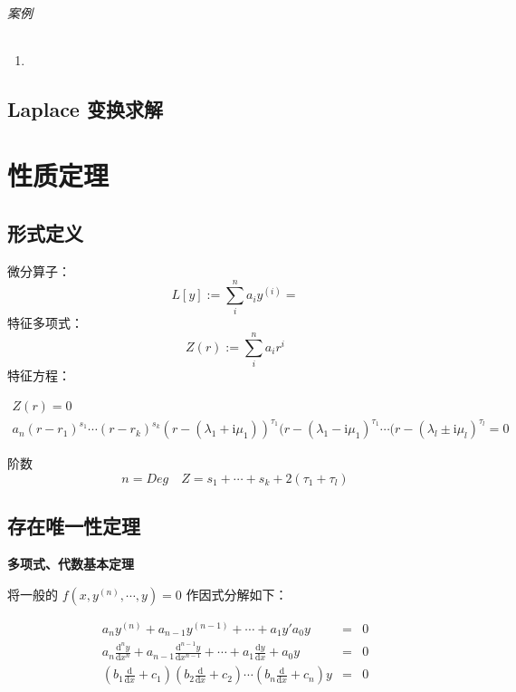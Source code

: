\documentclass[11pt]{report}
\begin{document}
\paragraph{案例}
\begin{enumerate}
\item 
\end{enumerate}
\chapter{Laplace 变换求解}
\label{sec:orgf46d000}

\part{性质定理}
\label{sec:org98e4bb2}
\chapter{形式定义}
\label{sec:org44eb8f5}
微分算子：
\begin{equation}
\label{eq:7}
L[y]:= \sum_i^n a_i y^{(i)} =
\end{equation}
特征多项式：
\begin{equation}
\label{eq:8}
Z(r):=\sum_i^n a_i r^i
\end{equation}
特征方程：

\begin{gather}
\label{eq:12}
Z(r)  =  0\\
a_n(r-r_1)^{s_1}\cdots(r-r_k)^{s_k}(r-(\lambda_1+\mathrm{i}\mu_1))^{\tau_1}(r-(\lambda_1-\mathrm{i}\mu_1)^{\tau_1}\cdots(r-(\lambda_l\pm\mathrm{i}\mu_l)^{\tau_l}=0
\end{gather}

阶数
\begin{equation}
\label{eq:13}
n=Deg \quad Z=s_1+\cdots+s_k+2(\tau_1+\tau_l)
\end{equation}

\chapter{存在唯一性定理}
\label{sec:org4ee3f0c}
{\bf 多项式、代数基本定理 }

将一般的 \(f(x,y^{(n)},\cdots,y)=0\) 作因式分解如下：

\begin{eqnarray}
\label{eq:1}
a_ny^{(n)}+ a_{n-1}y^{(n-1)}+\cdots+a_1y' a_0y& = & 0 \nonumber\\
a_n \frac{\mathrm{d}^ny}{\mathrm{d}x^n} + a_{n-1}\frac{\mathrm{d}^{n-1}y}{\mathrm{d}x^{n-1}}+\cdots+a_1 \frac{\mathrm{d}y}{\mathrm{d}x}+a_0y & = & 0 \nonumber\\
(b_1 \frac{\mathrm{d}}{\mathrm{d}x}+c_1)(b_2 \frac{\mathrm{d}}{\mathrm{d}x}+c_2)\cdots(b_n \frac{\mathrm{d}}{\mathrm{d}x}+c_n)y & = & 0
\end{eqnarray}
\end{document}
